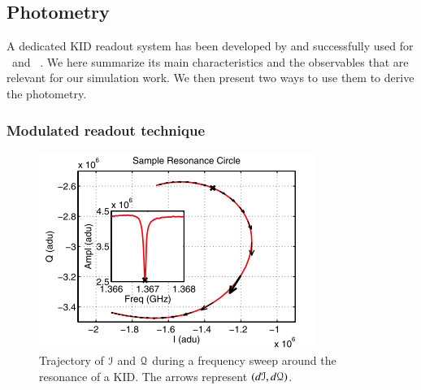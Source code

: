 
\subsection{Photometry}
\label{sec:signal}

A dedicated KID readout system has been developed by \citet{2013A&A...551L..12C}
and successfully used for \nika\ and \ . We here summarize its main characteristics and the observables
that are relevant for our simulation work. We then present two ways to use them
to derive the photometry.


\subsubsection{Modulated readout technique}

\begin{figure}
  \includegraphics[clip,angle=0,width=\columnwidth]{Figures/resonance-circle.png}
  \caption{Trajectory of $\mathcal{I}$ and $\mathcal{Q}$ during a frequency sweep around the
    resonance of a KID. The arrows represent $(d\mathcal{I},
    d\mathcal{Q})$. \citep{2013A&A...551L..12C}}
  \label{circle-iq}
\end{figure}

